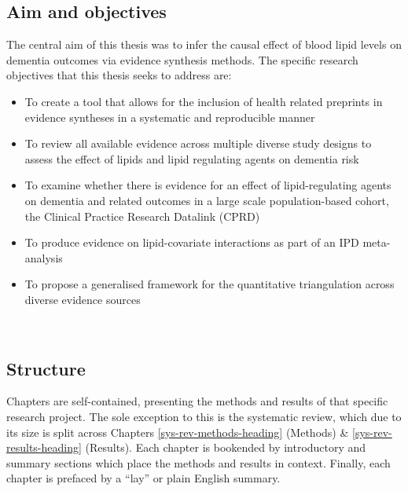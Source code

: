 \documentclass[a4paper, twoside]{templates/ociamthesis}
\providecommand{\tightlist}{%
  \setlength{\itemsep}{0pt}\setlength{\parskip}{0pt}}
\begin{document}
\hypertarget{aim-and-objectives}{%
\subsection{Aim and objectives}\label{aim-and-objectives}}

The central aim of this thesis was to infer the causal effect of blood lipid levels on dementia outcomes via evidence synthesis methods. The specific research objectives that this thesis seeks to address are:

\begin{itemize}
\tightlist
\item
  To create a tool that allows for the inclusion of health related preprints in evidence syntheses in a systematic and reproducible manner
\item
  To review all available evidence across multiple diverse study designs to assess the effect of lipids and lipid regulating agents on dementia risk
\item
  To examine whether there is evidence for an effect of lipid-regulating agents on dementia and related outcomes in a large scale population-based cohort, the Clinical Practice Research Datalink (CPRD)
\item
  To produce evidence on lipid-covariate interactions as part of an IPD meta-analysis
\item
  To propose a generalised framework for the quantitative triangulation across diverse evidence sources
\end{itemize}

~

\hypertarget{thesis-structure}{%
\subsection{Structure}\label{thesis-structure}}

Chapters are self-contained, presenting the methods and results of that specific research project. The sole exception to this is the systematic review, which due to its size is split across Chapters \ref{sys-rev-methods-heading} (Methods) \& \ref{sys-rev-results-heading} (Results). Each chapter is bookended by introductory and summary sections which place the methods and results in context. Finally, each chapter is prefaced by a ``lay'' or plain English summary.
\end{document}
